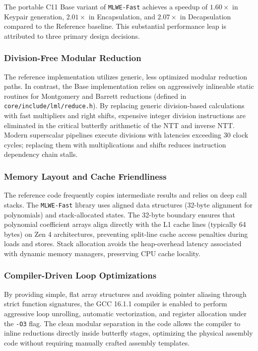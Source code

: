 The portable C11 Base variant of \texttt{MLWE-Fast} achieves a speedup of $1.60\times$ in Keypair generation, $2.01\times$ in Encapsulation, and $2.07\times$ in Decapsulation compared to the Reference baseline. This substantial performance leap is attributed to three primary design decisions.

\subsubsection{Division-Free Modular Reduction}
The reference implementation utilizes generic, less optimized modular reduction paths. In contrast, the Base implementation relies on aggressively inlineable static routines for Montgomery and Barrett reductions (defined in \texttt{core/}\allowbreak\texttt{include/}\allowbreak\texttt{lml/}\allowbreak\texttt{reduce.h}). By replacing generic division-based calculations with fast multipliers and right shifts, expensive integer division instructions are eliminated in the critical butterfly arithmetic of the NTT and inverse NTT. Modern superscalar pipelines execute divisions with latencies exceeding 30 clock cycles; replacing them with multiplications and shifts reduces instruction dependency chain stalls.

\subsubsection{Memory Layout and Cache Friendliness}
The reference code frequently copies intermediate results and relies on deep call stacks. The \texttt{MLWE-}\allowbreak\texttt{Fast} library uses aligned data structures (32-byte alignment for polynomials) and stack-allocated states. The 32-byte boundary ensures that polynomial coefficient arrays align directly with the L1 cache lines (typically 64 bytes) on Zen 4 architectures, preventing split-line cache access penalties during loads and stores. Stack allocation avoids the heap-overhead latency associated with dynamic memory managers, preserving CPU cache locality.

\subsubsection{Compiler-Driven Loop Optimizations}
By providing simple, flat array structures and avoiding pointer aliasing through strict function signatures, the GCC 16.1.1 compiler is enabled to perform aggressive loop unrolling, automatic vectorization, and register allocation under the \texttt{-O3} flag. The clean modular separation in the code allows the compiler to inline reductions directly inside butterfly stages, optimizing the physical assembly code without requiring manually crafted assembly templates.

